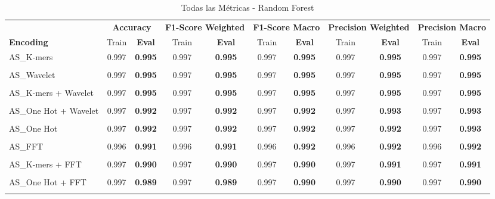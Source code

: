 \begin{table*}[htbp]
\centering
\caption{Todas las Métricas - Random Forest}
\label{tab:random_forest_complete}
\scriptsize
\begin{tabular}{lcccccccccc}
\toprule
& \multicolumn{2}{c}{\textbf{Accuracy}} & \multicolumn{2}{c}{\textbf{F1-Score Weighted}} & \multicolumn{2}{c}{\textbf{F1-Score Macro}} & \multicolumn{2}{c}{\textbf{Precision Weighted}} & \multicolumn{2}{c}{\textbf{Precision Macro}} \\
\cmidrule(lr){2-3} \cmidrule(lr){4-5} \cmidrule(lr){6-7} \cmidrule(lr){8-9} \cmidrule(lr){10-11}
\textbf{Encoding} & Train & \textbf{Eval} & Train & \textbf{Eval} & Train & \textbf{Eval} & Train & \textbf{Eval} & Train & \textbf{Eval} \\
\midrule
AS\_K-mers & 0.997 & \textbf{0.995} & 0.997 & \textbf{0.995} & 0.997 & \textbf{0.995} & 0.997 & \textbf{0.995} & 0.997 & \textbf{0.995} \\\\
AS\_Wavelet & 0.997 & \textbf{0.995} & 0.997 & \textbf{0.995} & 0.997 & \textbf{0.995} & 0.997 & \textbf{0.995} & 0.997 & \textbf{0.995} \\\\
AS\_K-mers + Wavelet & 0.997 & \textbf{0.995} & 0.997 & \textbf{0.995} & 0.997 & \textbf{0.995} & 0.997 & \textbf{0.995} & 0.997 & \textbf{0.995} \\\\
AS\_One Hot + Wavelet & 0.997 & \textbf{0.992} & 0.997 & \textbf{0.992} & 0.997 & \textbf{0.992} & 0.997 & \textbf{0.993} & 0.997 & \textbf{0.993} \\\\
AS\_One Hot & 0.997 & \textbf{0.992} & 0.997 & \textbf{0.992} & 0.997 & \textbf{0.992} & 0.997 & \textbf{0.992} & 0.997 & \textbf{0.993} \\\\
AS\_FFT & 0.996 & \textbf{0.991} & 0.996 & \textbf{0.991} & 0.996 & \textbf{0.992} & 0.996 & \textbf{0.992} & 0.996 & \textbf{0.992} \\\\
AS\_K-mers + FFT & 0.997 & \textbf{0.990} & 0.997 & \textbf{0.990} & 0.997 & \textbf{0.990} & 0.997 & \textbf{0.991} & 0.997 & \textbf{0.991} \\\\
AS\_One Hot + FFT & 0.997 & \textbf{0.989} & 0.997 & \textbf{0.989} & 0.997 & \textbf{0.990} & 0.997 & \textbf{0.990} & 0.997 & \textbf{0.990} \\\\

\end{tabular}
\end{table*}
